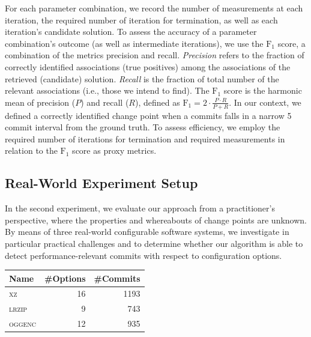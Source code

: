 \documentclass[sigconf]{acmart}
\begin{document}
	For each parameter combination, we record the number of measurements at each iteration, the required number of iteration for termination, as well as each iteration's candidate solution. To assess the accuracy of a parameter combination's outcome (as well as intermediate iterations), we use the $\text{F}_1$ score, a combination of the metrics precision and recall. \emph{Precision} refers to the fraction of correctly identified associations (true positives) among the associations of the retrieved (candidate) solution. \emph{Recall} is the fraction of total number of the relevant associations (i.e., those we intend to find). The $\text{F}_1$ score is the harmonic mean of precision ($P$) and recall ($R$), defined as $\text{F}_1 = 2\cdot\frac{P \cdot R}{P + R}$.	In our context, we defined a correctly identified change point when a commits falls in a narrow 5 commit interval from the ground truth.
	To assess efficiency, we employ the required number of iterations for termination and required measurements in relation to the $\text{F}_1$ score as proxy metrics.
	
	\subsection{Real-World Experiment Setup}
	In the second experiment, we evaluate our approach from a practitioner's perspective, where the properties and whereabouts of change points are unknown.  By means of three real-world configurable software systems, we investigate in particular practical challenges and to determine whether our algorithm is able to detect performance-relevant commits with respect to configuration options. 

    \begin{table}
        \centering
        \label{tab:properties}
        \begin{tabular}{lrr}
			\toprule
			\textbf{Name} & \textbf{\#Options} & \textbf{\#Commits}\\
			\midrule
			\textsc{xz} & 16 & 1193\\
			\textsc{lrzip} & 9 & 743 \\
			\textsc{oggenc} & 12 & 935\\
			\bottomrule
		\end{tabular}
    \end{table}
\end{document}
